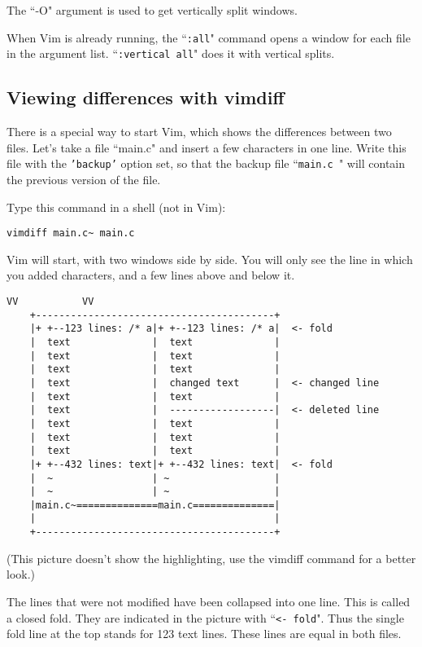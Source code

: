 The ``-O" argument is used to get vertically split windows.

When Vim is already running, the ``\texttt{:all}" command opens a window for each file in the argument list.  ``\texttt{:vertical all}" does it with vertical splits.

\subsection{Viewing differences with vimdiff}
\label{Viewing differences with vimdiff}

There is a special way to start Vim, which shows the differences between two files.
Let's take a file ``main.c" and insert a few characters in one line.
Write this file with the \texttt{'backup'} option set, so that the backup file ``\texttt{main.c~}" will contain the previous version of the file.

Type this command in a shell (not in Vim):

 \begin{Verbatim}[samepage=true]
 vimdiff main.c~ main.c
 \end{Verbatim}

Vim will start, with two windows side by side.
You will only see the line in which you added characters, and a few lines above and below it.

\begin{Verbatim}[samepage=true]
     VV           VV
    +-----------------------------------------+
    |+ +--123 lines: /* a|+ +--123 lines: /* a|  <- fold
    |  text              |  text              |
    |  text              |  text              |
    |  text              |  text              |
    |  text              |  changed text      |  <- changed line
    |  text              |  text              |
    |  text              |  ------------------|  <- deleted line
    |  text              |  text              |
    |  text              |  text              |
    |  text              |  text              |
    |+ +--432 lines: text|+ +--432 lines: text|  <- fold
    |  ~                 | ~                  |
    |  ~                 | ~                  |
    |main.c~==============main.c==============|
    |                                         |
    +-----------------------------------------+
\end{Verbatim}

(This picture doesn't show the highlighting, use the vimdiff command for a better look.)

The lines that were not modified have been collapsed into one line.
This is called a closed fold.
They are indicated in the picture with ``\texttt{<- fold}".
Thus the single fold line at the top stands for 123 text lines.
These lines are equal in both files.

